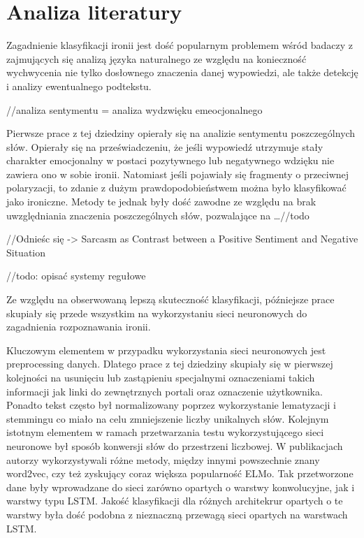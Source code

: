 \newpage %
\section{Analiza literatury}



Zagadnienie klasyfikacji ironii jest dość popularnym problemem wśród badaczy z zajmujących się analizą języka naturalnego ze względu na konieczność wychwycenia nie tylko dosłownego znaczenia danej wypowiedzi, ale także detekcję i analizy ewentualnego podtekstu.  

//analiza sentymentu = analiza wydzwięku emeocjonalnego 

Pierwsze prace z tej dziedziny opierały się na analizie sentymentu poszczególnych słów. Opierały się na przeświadczeniu, że jeśli wypowiedź utrzymuje stały charakter emocjonalny w postaci pozytywnego lub negatywnego wdzięku nie zawiera ono w sobie ironii. Natomiast jeśli pojawiały się fragmenty o przeciwnej polaryzacji, to zdanie z dużym prawdopodobieństwem można było klasyfikować jako ironiczne. Metody te jednak były dość zawodne ze względu na brak uwzględniania znaczenia poszczególnych słów, pozwalające na …//todo 

//Odnieśc się ->  Sarcasm as Contrast between a Positive Sentiment and Negative Situation 

//todo: opisać systemy regułowe 

 

Ze względu na obserwowaną lepszą skuteczność klasyfikacji, późniejsze prace skupiały się przede wszystkim na wykorzystaniu sieci neuronowych do zagadnienia rozpoznawania ironii.  

Kluczowym elementem w przypadku wykorzystania sieci neuronowych jest preprocessing danych. Dlatego prace z tej dziedziny skupiały się w pierwszej kolejności na usunięciu lub zastąpieniu specjalnymi oznaczeniami takich informacji jak linki do zewnętrznych portali oraz oznaczenie użytkownika. Ponadto tekst często był normalizowany poprzez wykorzystanie lematyzacji i stemmingu co miało na celu zmniejszenie liczby unikalnych słów. Kolejnym istotnym elementem w ramach przetwarzania testu wykorzystującego sieci neuronowe był sposób konwersji słów do przestrzeni liczbowej. W publikacjach autorzy wykorzystywali różne metody, między innymi powszechnie znany word2vec, czy też zyskujący coraz większa popularność ELMo. Tak przetworzone dane były wprowadzane do sieci zarówno opartych o warstwy konwolucyjne, jak i warstwy typu LSTM. Jakość klasyfikacji dla różnych architekrur opartych o te warstwy była dość podobna z nieznaczną przewagą sieci opartych na warstwach LSTM. 

 

